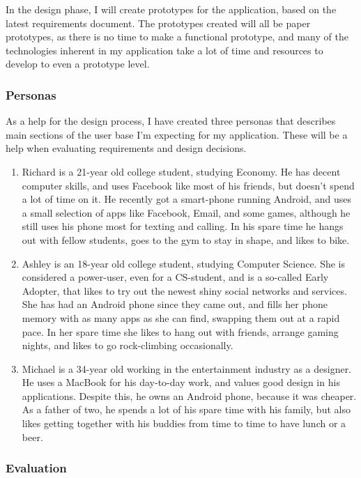 \documentclass[]{report}
\begin{document}
In the design phase, I will create prototypes for the application, based on the
latest requirements document. The prototypes created will all be paper
prototypes, as there is no time to make a functional prototype, and many of the
technologies inherent in my application take a lot of time and resources to
develop to even a prototype level.

\subsubsection{Personas}

As a help for the design process, I have created three personas that describes
main sections of the user base I'm expecting for my application. These will be a
help when evaluating requirements and design decisions.

\begin{enumerate}
\item Richard is a 21-year old college student, studying Economy. He has decent
  computer skills, and uses Facebook like most of his friends, but doesn't spend
  a lot of time on it. He recently got a smart-phone running Android, and uses a
  small selection of apps like Facebook, Email, and some games, although he
  still uses his phone most for texting and calling. In his spare time he hangs
  out with fellow students, goes to the gym to stay in shape, and likes to bike.
\item Ashley is an 18-year old college student, studying Computer Science. She
  is considered a power-user, even for a CS-student, and is a so-called Early
  Adopter, that likes to try out the newest shiny social networks and
  services. She has had an Android phone since they came out, and fills her
  phone memory with as many apps as she can find, swapping them out at a rapid
  pace. In her spare time she likes to hang out with friends, arrange gaming
  nights, and likes to go rock-climbing occasionally.
\item Michael is a 34-year old working in the entertainment industry as a
  designer. He uses a MacBook for his day-to-day work, and values good design in
  his applications. Despite this, he owns an Android phone, because it was
  cheaper. As a father of two, he spends a lot of his spare time with his
  family, but also likes getting together with his buddies from time to time to
  have lunch or a beer.
\end{enumerate}

\subsubsection{Evaluation}
\end{document}
